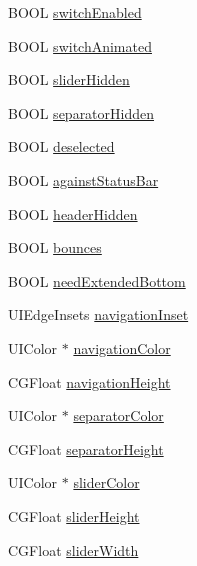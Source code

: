 \begin{DoxyCompactItemize}
\item 
B\+O\+OL \mbox{\hyperlink{interface_v_t_magic_view_a04efb18d92443118ea2db6abcc771b20}{switch\+Enabled}}
\item 
B\+O\+OL \mbox{\hyperlink{interface_v_t_magic_view_a22305459589290ebd9179281e3cac615}{switch\+Animated}}
\item 
B\+O\+OL \mbox{\hyperlink{interface_v_t_magic_view_ab2aa97f3915c3373b324f1d57b02d55e}{slider\+Hidden}}
\item 
B\+O\+OL \mbox{\hyperlink{interface_v_t_magic_view_acc68f32c3cd5015e807fee5a9dfbc14b}{separator\+Hidden}}
\item 
B\+O\+OL \mbox{\hyperlink{interface_v_t_magic_view_af10514531a4e98f364df259379f88139}{deselected}}
\item 
B\+O\+OL \mbox{\hyperlink{interface_v_t_magic_view_ab6d894341807ff4d766192ab9cf11745}{against\+Status\+Bar}}
\item 
B\+O\+OL \mbox{\hyperlink{interface_v_t_magic_view_ac1e2788b17088484f09ccd71fdae3b5e}{header\+Hidden}}
\item 
B\+O\+OL \mbox{\hyperlink{interface_v_t_magic_view_a92f66e2a4b872c2cfcaec3414e469744}{bounces}}
\item 
B\+O\+OL \mbox{\hyperlink{interface_v_t_magic_view_ab7422f3bbde42aefda2b4f8d265f85bd}{need\+Extended\+Bottom}}
\item 
U\+I\+Edge\+Insets \mbox{\hyperlink{interface_v_t_magic_view_aa507a5dfdfc802f2bf564c91da900a32}{navigation\+Inset}}
\item 
U\+I\+Color $\ast$ \mbox{\hyperlink{interface_v_t_magic_view_ae34c71591e06cf202950ec4c71e8b739}{navigation\+Color}}
\item 
C\+G\+Float \mbox{\hyperlink{interface_v_t_magic_view_a4e93971ee08a1e7ab603d9d50e54901f}{navigation\+Height}}
\item 
U\+I\+Color $\ast$ \mbox{\hyperlink{interface_v_t_magic_view_ad3e3cf322ec3b4a78cc3f1864ea74dea}{separator\+Color}}
\item 
C\+G\+Float \mbox{\hyperlink{interface_v_t_magic_view_a468f4b9b71f82372965638941cf57b43}{separator\+Height}}
\item 
U\+I\+Color $\ast$ \mbox{\hyperlink{interface_v_t_magic_view_ad3ebc1b4813f53a729d162ff1065ebac}{slider\+Color}}
\item 
C\+G\+Float \mbox{\hyperlink{interface_v_t_magic_view_a0c9ae5184770104f2f9245ac407e74ab}{slider\+Height}}
\item 
C\+G\+Float \mbox{\hyperlink{interface_v_t_magic_view_a91de58af9954021e275760e1af013a19}{slider\+Width}}

\end{DoxyCompactItemize}
